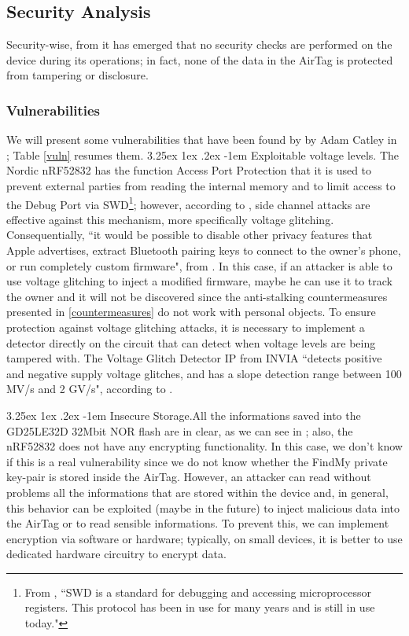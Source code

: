 \documentclass[english]{article}
\makeatletter
\renewcommand\paragraph{\@startsection{paragraph}{5}{\z@}%
  {3.25ex \@plus1ex \@minus.2ex}%
  {-1em}%
  {\normalfont\normalsize\bfseries}}
\makeatother
\begin{document}
\subsection{Security Analysis}\label{sec}
Security-wise, from \cite{reverse} it has emerged that no security checks are performed on the device during its operations; in fact, none of the data in the AirTag is protected from tampering or disclosure.
\subsubsection{Vulnerabilities}\label{sec:vuln}
We will present some vulnerabilities that have been found by by Adam Catley in \cite{reverse}; Table \ref{vuln} resumes them.
\paragraph{Exploitable voltage levels.}
The Nordic nRF52832 has the function Access Port Protection \cite{nordicsemi} that it is used to prevent external parties from reading the internal memory and to limit access to the Debug Port via SWD\footnote{From \cite{Oberli_2019}, ``SWD is a standard for debugging and accessing microprocessor registers. This protocol has been in use for many years and is still in use today."}; however, according to \cite{side}, side channel attacks are effective against this mechanism, more specifically voltage glitching. Consequentially, ``it would be possible to disable other privacy features that Apple advertises, extract Bluetooth pairing keys to connect to the owner’s phone, or run completely custom firmware", from \cite{reverse}. In this case, if an attacker is able to use voltage glitching to inject a modified firmware, maybe he can use it to track the owner and it will not be discovered since the anti-stalking countermeasures presented in \ref{countermeasures} do not work with personal objects. 
To ensure protection against voltage glitching attacks, it is necessary to implement a detector directly on the circuit that can detect when voltage levels are being tampered with. The Voltage Glitch Detector IP from INVIA ``detects positive and negative supply voltage glitches, and has a slope detection range between 100 MV/s and 2 GV/s", according to \cite{voltage}.

\paragraph{Insecure Storage.}All the informations saved into the GD25LE32D 32Mbit NOR flash are in clear, as we can see in \cite{tweet}; also, the nRF52832 does not have any encrypting functionality. In this case, we don't know if this is a real vulnerability since we do not know whether the FindMy private key-pair is stored inside the AirTag. However, an attacker can read without problems all the informations that are stored within the device and, in general, this behavior can be exploited (maybe in the future) to inject malicious data into the AirTag or to read sensible informations. To prevent this, we can implement encryption via software or hardware; typically, on small devices, it is better to use dedicated hardware circuitry to encrypt data.
\end{document}

